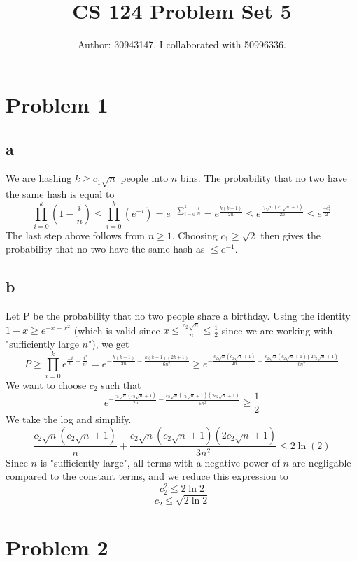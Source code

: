 \documentclass{article}
\begin{document}
\title{CS 124 Problem Set 5}
\author{Author: 30943147. I collaborated with 50996336.}
\maketitle

\section*{Problem 1}
\subsection*{a}
We are hashing $k \geq c_1 \sqrt{n}$ people into $n$ bins. The probability that no two have the same hash is equal to
$$\prod\limits_{i=0}^k (1-\frac{i}{n}) \leq \prod\limits_{i=0}^k (e^{-i}) = e^{-\sum\limits_{i=0}^k \frac{i}{n}} = e^{\frac{k(k+1)}{2n}} \leq e^{\frac{c_1 \sqrt{n} (c_1 \sqrt{n} + 1)}{2n}} \leq e^{\frac{-c_1^2}{2}}$$
The last step above follows from $n \geq 1$. Choosing $c_1 \geq \sqrt{2}$ then gives the probability that no two have the same hash as $\leq e^{-1}$.

\subsection*{b}
Let P be the probability that no two people share a birthday. Using the identity $1-x \geq e^{-x-x^2}$ (which is valid since $x \leq \frac{c_2 \sqrt{n}}{n} \leq \frac{1}{2}$ since we are working with "sufficiently large $n$"), we get
$$P \geq \prod_{i=0}^k e^{\frac{-i}{n} - \frac{i^2}{n^2}} = e^{-\frac{k (k+1)}{2n} - \frac{k (k+1) (2k + 1)}{6 n^2}}
 \geq  e^{-\frac{c_2 \sqrt{n} (c_2 \sqrt{n} +1)}{2n} - \frac{c_2 \sqrt{n} (c_2 \sqrt{n}+1) (2c_2 \sqrt{n} + 1)}{6 n^2}}$$
We want to choose $c_2$ such that 
$$e^{-\frac{c_2 \sqrt{n} (c_2 \sqrt{n} +1)}{2n} - \frac{c_2 \sqrt{n} (c_2 \sqrt{n}+1) (2c_2 \sqrt{n} + 1)}{6 n^2}} \geq \frac{1}{2}$$
We take the log and simplify. 
$$\frac{c_2 \sqrt{n} (c_2 \sqrt{n} +1)}{n} + \frac{c_2 \sqrt{n} (c_2 \sqrt{n}+1) (2c_2 \sqrt{n} + 1)}{3 n^2} \leq 2 \ln (2)$$
Since $n$ is "sufficiently large", all terms with a negative power of $n$ are negligable compared to the constant terms, and we reduce this expression to
$$c_2^2 \leq 2 \ln 2$$
$$c_2 \leq \sqrt{2 \ln 2}$$

\section*{Problem 2}
\end{document}
